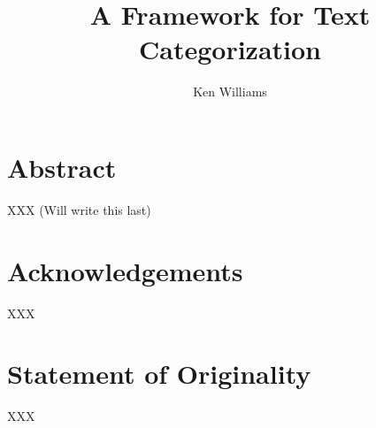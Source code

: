\documentclass[a4paper]{report}
\title{A Framework for Text Categorization}
\author{Ken Williams}
\begin{document}
\newcommand{\method}[1]{\texttt{#1()}}
\newcommand{\class}[1]{\texttt{#1}}
\newcommand{\aicat}{\class{AI::Cat\-e\-gor\-i\-zer}}
\newcommand{\ensemble}{\class{Learn\-er::En\-sem\-ble}}

\maketitle
\chapter*{Abstract}
XXX (Will write this last)
\chapter*{Acknowledgements}
XXX
\chapter*{Statement of Originality}
XXX
\tableofcontents










\end{document}
